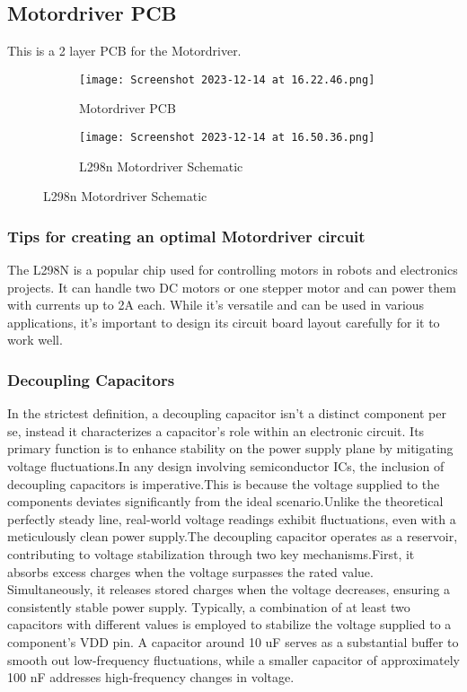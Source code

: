 \documentclass[../report.tex]{subfiles}
\begin{document}
\subsection{Motordriver PCB}
This is a 2 layer PCB for the Motordriver. 
\begin{figure}[H]
    \centering
    \begin{subfigure}[b]{0.4\linewidth}
      \texttt{[image: Screenshot 2023-12-14 at 16.22.46.png]}
      \caption{Motordriver PCB} 
    \end{subfigure}
    \begin{subfigure}[b]{0.4\linewidth}
      \texttt{[image: Screenshot 2023-12-14 at 16.50.36.png]}
      \caption{L298n Motordriver Schematic}
    \end{subfigure}
  \end{figure}

  \subsubsection{Tips for creating an optimal Motordriver circuit}
  The L298N is a popular chip used for controlling motors in robots and electronics projects. It can handle two DC motors or one stepper motor and can power them with currents up to 2A each. While it's versatile and can be used in various applications, it's important to design its circuit board layout carefully for it to work well. 
 
  \subsubsection{Decoupling Capacitors}
  In the strictest definition, a decoupling capacitor isn't a distinct component per se, instead it characterizes a capacitor's role within an electronic circuit. 
  Its primary function is to enhance stability on the power supply plane by mitigating voltage fluctuations.In any design involving semiconductor ICs, the inclusion of decoupling capacitors is imperative.This is because the voltage supplied to the components deviates significantly from the ideal scenario.Unlike the theoretical perfectly steady line, real-world voltage readings exhibit fluctuations, even with a meticulously clean power supply.The decoupling capacitor operates as a reservoir, contributing to voltage stabilization through two key mechanisms.First, it absorbs excess charges when the voltage surpasses the rated value. Simultaneously, it releases stored charges when the voltage decreases, ensuring a consistently stable power supply.
  Typically, a combination of at least two capacitors with different values is employed to stabilize the voltage supplied to a component's VDD pin. A capacitor around 10 uF serves as a substantial buffer to smooth out low-frequency fluctuations, while a smaller capacitor of approximately 100 nF addresses high-frequency changes in voltage. 
\end{document}
